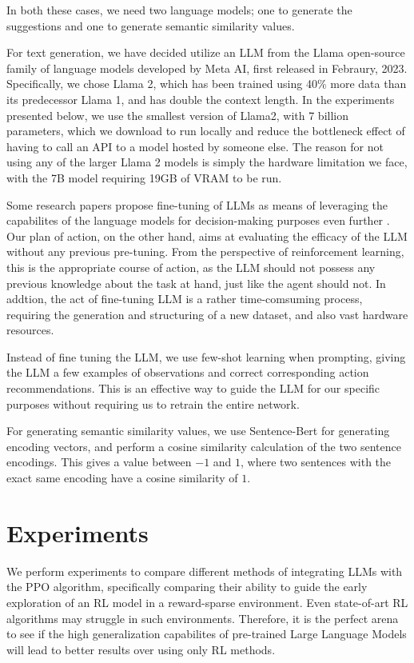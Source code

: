 \documentclass[conference]{IEEEtran}
\begin{document}
In both these cases, we need two language models; one to generate the suggestions and one to generate semantic similarity values.

For text generation, we have decided utilize an LLM from the Llama open-source family of language models developed by Meta AI, first released in Febraury, 2023. Specifically, we chose Llama 2, which has been trained using 40\% more data than its predecessor Llama 1, and has double the context length\cite{llama}. In the experiments presented below, we use the smallest version of Llama2, with 7 billion parameters, which we download to run locally and reduce the bottleneck effect of having to call an API to a model hosted by someone else. The reason for not using any of the larger Llama 2 models is simply the hardware limitation we face, with the 7B model requiring 19GB of VRAM to be run. 

Some research papers propose fine-tuning of LLMs as means of leveraging the capabilites of the language models for decision-making purposes even further \cite{grounding}. Our plan of action, on the other hand, aims at evaluating the efficacy of the LLM without any previous pre-tuning. From the perspective of reinforcement learning, this is the appropriate course of action, as the LLM should not possess any previous knowledge about the task at hand, just like the agent should not. In addtion, the act of fine-tuning LLM is a rather time-comsuming process, requiring the generation and structuring of a new dataset, and also vast hardware resources. 

Instead of fine tuning the LLM, we use few-shot learning when prompting, giving the LLM a few examples of observations and correct corresponding action recommendations. This is an effective way to guide the LLM for our specific purposes without requiring us to retrain the entire network.

For generating semantic similarity values, we use Sentence-Bert \cite{bert} for generating encoding vectors, and perform a cosine similarity calculation of the two sentence encodings. This gives a value between $-1$ and $1$, where two sentences with the exact same encoding have a cosine similarity of $1$.


\section{Experiments}

We perform experiments to compare different methods of integrating LLMs with the PPO algorithm, specifically comparing their ability to guide the early exploration of an RL model in a reward-sparse environment. Even state-of-art RL algorithms may struggle in such environments. Therefore, it is the perfect arena to see if the high generalization capabilites of pre-trained Large Language Models will lead to better results over using only RL methods.
\end{document}
